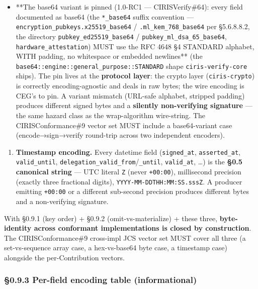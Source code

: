 \documentclass[10pt]{article}
\begin{document}
\begin{itemize}\setlength\itemsep{0pt}
\item **The base64 variant is pinned (1.0-RC1 — CIRISVerify\#64): every field documented as base64 (the \texttt{*\_base64} suffix convention — \texttt{encryption\_pubkeys.x25519\_base64} / \texttt{.ml\_kem\_768\_base64} per §5.6.8.8.2, the directory \texttt{pubkey\_ed25519\_base64} / \texttt{pubkey\_ml\_dsa\_65\_base64}, \texttt{hardware\_attestation}) MUST use the RFC 4648 §4 STANDARD alphabet, WITH padding, no whitespace or embedded newlines** (the \texttt{base64::engine::general\_purpose::STANDARD} shape \texttt{ciris-verify-core} ships). The pin lives at the \textbf{protocol layer}: the crypto layer (\texttt{ciris-crypto}) is correctly encoding-agnostic and deals in raw bytes; the wire encoding is CEG's to pin. A variant mismatch (URL-safe alphabet, stripped padding) produces different signed bytes and a \textbf{silently non-verifying signature} — the same hazard class as the wrap-algorithm wire-string. The CIRISConformance\#9 vector set MUST include a base64-variant case (encode→sign→verify round-trip across two independent encoders).
\end{itemize}

\begin{enumerate}\setlength\itemsep{0pt}
\item \textbf{Timestamp encoding.} Every datetime field (\texttt{signed\_at}, \texttt{asserted\_at}, \texttt{valid\_until}, \texttt{delegation\_valid\_from}/\texttt{\_until}, \texttt{valid\_at}, …) is the \textbf{§0.5 canonical string} — UTC literal \texttt{Z} (never \texttt{+00:00}), millisecond precision (exactly three fractional digits), \texttt{YYYY-MM-DDTHH:MM:SS.sssZ}. A producer emitting \texttt{+00:00} or a different sub-second precision produces different bytes and a non-verifying signature.
\end{enumerate}


With §0.9.1 (key order) + §0.9.2 (omit-vs-materialize) + these three, \textbf{byte-identity across conformant implementations is closed by construction}. The CIRISConformance\#9 cross-impl JCS vector set MUST cover all three (a set-vs-sequence array case, a hex-vs-base64 byte case, a timestamp case) alongside the per-Contribution vectors.


\subsubsection*{§0.9.3 Per-field encoding table (informational)}
\end{document}
